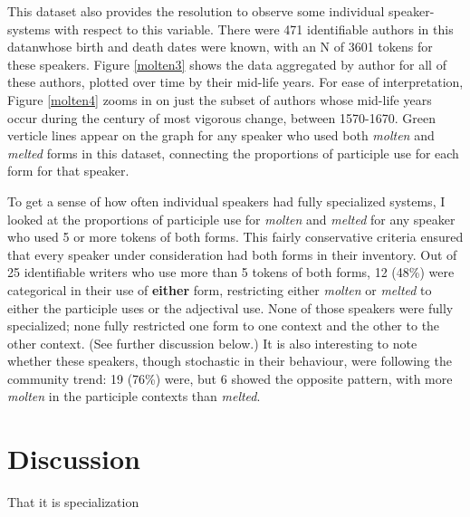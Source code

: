 \documentclass{artikel3}
\begin{document}
This dataset also provides the resolution to observe some individual speaker-systems with respect to this variable. There were 471 identifiable authors in this datanwhose birth and death dates were known, with an N of 3601 tokens for these speakers. Figure \ref{molten3} shows the data aggregated by author for all of these authors, plotted over time by their mid-life years. For ease of interpretation, Figure \ref{molten4} zooms in on just the subset of authors whose mid-life years occur during the century of most vigorous change, between 1570-1670. Green verticle lines appear on the graph for any speaker who used both \textsl{molten} and \textsl{melted} forms in this dataset, connecting the proportions of participle use for each form for that speaker.

To get a sense of how often individual speakers had fully specialized systems, I looked at the proportions of participle use for \textsl{molten} and \textsl{melted} for any speaker who used 5 or more tokens of both forms. This fairly conservative criteria ensured that every speaker under consideration had both forms in their inventory. Out of 25 identifiable writers who use more than 5 tokens of both forms, 12 (48\%) were categorical in their use of \textbf{either} form, restricting either \textsl{molten} or \textsl{melted} to either the participle uses or the adjectival use. None of those speakers were fully specialized; none fully restricted one form to one context and the other to the other context. (See further discussion below.) It is also interesting to note whether these speakers, though stochastic in their behaviour, were following the community trend: 19 (76\%) were, but 6 showed the opposite pattern, with more \textsl{molten} in the participle contexts than \textsl{melted}.




\section{Discussion}
\label{discuss}

That it is specialization
\end{document}
